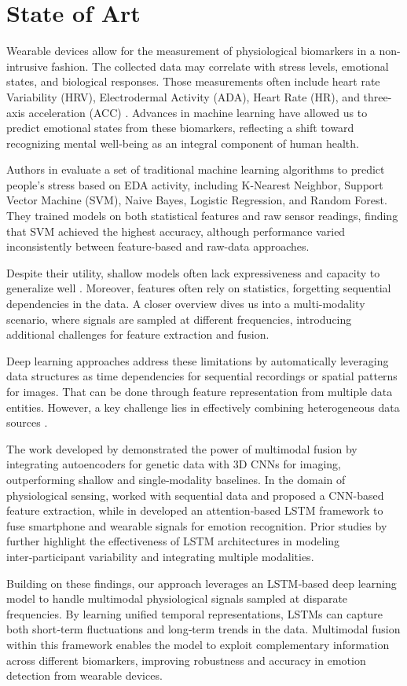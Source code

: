 \section{State of Art}

Wearable devices allow for the measurement of physiological biomarkers in a non-intrusive fashion. The collected data may correlate with stress levels, emotional states, and biological responses. Those measurements often include heart rate Variability (HRV), Electrodermal Activity (ADA), Heart Rate (HR), and three-axis acceleration (ACC) \cite{Vos2023}.  Advances in machine learning have allowed us to predict emotional states from these biomarkers, reflecting a shift toward recognizing mental well-being as an integral component of human health.

Authors in \cite{Zhu2023} evaluate a set of traditional machine learning algorithms to predict people's stress based on EDA activity, including K-Nearest Neighbor, Support Vector Machine (SVM), Naive Bayes, Logistic Regression, and Random Forest. They trained models on both statistical features and raw sensor readings, finding that SVM achieved the highest accuracy, although performance varied inconsistently between feature-based and raw-data approaches.

Despite their utility, shallow models often lack expressiveness and capacity to generalize well \cite{Yang2023}. Moreover, features often rely on statistics, forgetting sequential dependencies in the data. A closer overview dives us into a multi-modality scenario, where signals are sampled at different frequencies, introducing additional challenges for feature extraction and fusion.

Deep learning approaches address these limitations by automatically leveraging data structures as time dependencies for sequential recordings or spatial patterns for images. That can be done through feature representation from multiple data entities. However, a key challenge lies in effectively combining heterogeneous data sources \cite{Baltrusaitis2019,Liang2024}. 

The work developed by \cite{Venugopalan2021} demonstrated the power of multimodal fusion by integrating autoencoders for genetic data with 3D CNNs for imaging, outperforming shallow and single‑modality baselines. In the domain of physiological sensing, \cite{Wan2020743} worked with sequential data and proposed a CNN-based feature extraction, while in \cite{Yang20231082} developed an attention‑based LSTM framework to fuse smartphone and wearable signals for emotion recognition. Prior studies by \cite{Zhang20211138,Li20213323} further highlight the effectiveness of LSTM architectures in modeling inter‑participant variability and integrating multiple modalities.

Building on these findings, our approach leverages an LSTM‑based deep learning model to handle multimodal physiological signals sampled at disparate frequencies. By learning unified temporal representations, LSTMs can capture both short‑term fluctuations and long‑term trends in the data. Multimodal fusion within this framework enables the model to exploit complementary information across different biomarkers, improving robustness and accuracy in emotion detection from wearable devices.